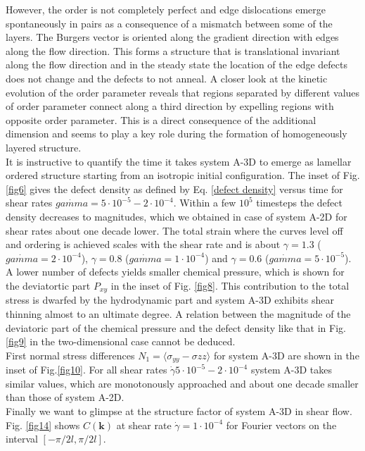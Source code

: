 \documentclass[8.5pt,twoside,twocolumn]{article}
\newcommand{\e}[1]{\cdot10^{#1}}
\newcommand{\gd}{\dot{\gamma}}
\begin{document}
However, the order is not completely perfect and edge dislocations emerge spontaneously in pairs as a consequence of a mismatch between some of the layers.
The Burgers vector is oriented along the gradient direction with edges along the flow direction.
This forms a structure that is translational invariant along the flow direction and in the steady state the location of the edge defects does not change and the defects to not anneal.
A closer look at the kinetic evolution of the order parameter reveals that regions separated by different values of order parameter connect along a third direction by expelling regions with opposite order parameter.
This is a direct consequence of the additional dimension and seems to play a key role during the formation of homogeneously layered structure.\\
It is instructive to quantify the time it takes system A-3D to emerge as lamellar ordered structure starting from an isotropic initial configuration.  
The inset of Fig. \ref{fig6} gives the defect density as defined by Eq. \ref{defect density} versus time for shear rates $\dot{gamma}=5\cdot10^{-5}-2\cdot10^{-4}$. 
Within a few $10^5$ timesteps the defect density decreases to magnitudes, which we obtained in case of system A-2D for shear rates about one decade lower.
The total strain where the curves level off and ordering is achieved scales with the shear rate and is about $\gamma=1.3$ ($\dot{gamma}=2\cdot10^{-4}$), $\gamma=0.8$ ($\dot{gamma}=1\cdot10^{-4}$) and $\gamma=0.6$ ($\dot{gamma}=5\cdot10^{-5}$).
 \\
A lower number of defects yields smaller chemical pressure, which is shown for the deviatortic part $P_{xy}$ in the inset of Fig. \ref{fig8}.
This contribution to the total stress is dwarfed by the hydrodynamic part and system A-3D exhibits shear thinning almost to an ultimate degree.
A relation between the magnitude of the deviatoric part of the chemical pressure and the defect density like that in Fig. \ref{fig9} in the two-dimensional case cannot be deduced.\\
First normal stress differences $N_1=\langle\sigma_{yy}-\sigma{zz}\rangle$ for system A-3D are shown in the inset of Fig.\ref{fig10}.
For all shear rates $\gd5\e{-5}-2\e{-4}$ system A-3D takes similar values, which are monotonously approached and about one decade smaller than those of system A-2D.\\ 
Finally we want to glimpse at the structure factor of system A-3D in shear flow.
Fig. \ref{fig14} shows $C({\bm k})$ at shear rate $\gd=1\e{-4}$ for Fourier vectors on the interval $[-\pi/2 l, \pi/ 2 l]$.
\end{document}
